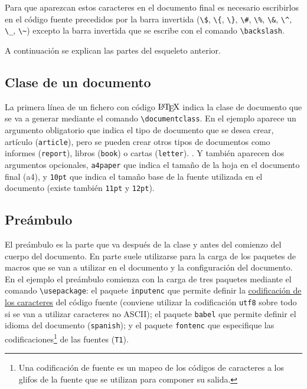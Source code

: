 \documentclass[
  a4paper,
]{scrreport}
\begin{document}
Para que aparezcan estos caracteres en el documento final es necesario
escribirlos en el código fuente precedidos por la barra invertida
(\texttt{\textbackslash{}\$}, \texttt{\textbackslash{}\{},
\texttt{\textbackslash{}\}}, \texttt{\textbackslash{}\#},
\texttt{\textbackslash{}\%}, \texttt{\textbackslash{}\&},
\texttt{\textbackslash{}\^{}}, \texttt{\textbackslash{}\_},
\texttt{\textbackslash{}\textasciitilde{}}) excepto la barra invertida
que se escribe con el comando \texttt{\textbackslash{}backslash}.

A continuación se explican las partes del esqueleto anterior.

\hypertarget{clase-de-un-documento}{%
\subsection{Clase de un documento}\label{clase-de-un-documento}}

La primera línea de un fichero con código \(\text{\LaTeX}\) indica la
clase de documento que se va a generar mediante el comando
\texttt{\textbackslash{}documentclass}. En el ejemplo aparece un
argumento obligatorio que indica el tipo de documento que se desea
crear, artículo (\texttt{article}), pero se pueden crear otros tipos de
documentos como informes (\texttt{report}), libros (\texttt{book}) o
cartas (\texttt{letter}). . Y también aparecen dos argumentos
opcionales, \texttt{a4paper} que indica el tamaño de la hoja en el
documento final (a4), y \texttt{10pt} que indica el tamaño base de la
fuente utilizada en el documento (existe también \texttt{11pt} y
\texttt{12pt}).

\hypertarget{preuxe1mbulo}{%
\subsection{Preámbulo}\label{preuxe1mbulo}}

El preámbulo es la parte que va después de la clase y antes del comienzo
del cuerpo del documento. En parte suele utilizarse para la carga de los
paquetes de macros que se van a utilizar en el documento y la
configuración del documento. En el ejemplo el preámbulo comienza con la
carga de tres paquetes mediante el comando
\texttt{\textbackslash{}usepackage}: el paquete \texttt{inputenc} que
permite definir la
\href{https://es.wikipedia.org/wiki/Codificaci\%C3\%B3n_de_caracteres}{codificación
de los caracteres} del código fuente (conviene utilizar la codificación
\texttt{utf8} sobre todo si se van a utilizar caracteres no ASCII); el
paquete \texttt{babel} que permite definir el idioma del documento
(\texttt{spanish}); y el paquete \texttt{fontenc} que especifique las
codificaciones\footnote{Una codificación de fuente es un mapeo de los
  códigos de caracteres a los glifos de la fuente que se utilizan para
  componer su salida.} de las fuentes (\texttt{T1}).
\end{document}
